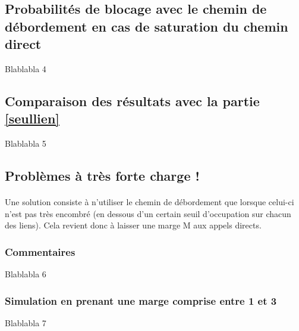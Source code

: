         \subsection{Probabilités de blocage avec le chemin de débordement en cas de saturation du chemin direct}
Blablabla 4
%
        \subsection{Comparaison des résultats avec la partie \ref{seullien}}
Blablabla 5
%
        \subsection{Problèmes à très forte charge !}
            \paragraph{}
Une solution consiste à n'utiliser le chemin de débordement que lorsque celui-ci n'est pas très encombré (en dessous d'un certain seuil d'occupation sur chacun des liens).
Cela revient donc à laisser une marge M aux appels directs.
%
            \subsubsection{Commentaires}
Blablabla 6
%
            \subsubsection{Simulation en prenant une marge comprise entre 1 et 3}
Blablabla 7
%
    \clearpage
%
